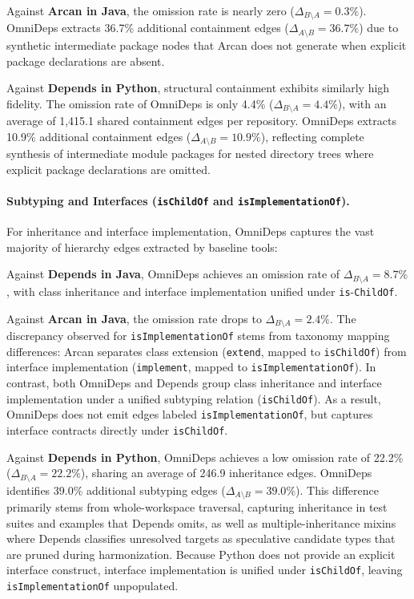 Against \textbf{Arcan in Java}, the omission rate is nearly zero
($\Delta_{B \setminus A} = 0.3\%$). OmniDeps extracts 36.7\%
additional containment edges ($\Delta_{A \setminus B} = 36.7\%$) due
to synthetic intermediate package nodes that Arcan does not generate
when explicit package declarations are absent.

Against \textbf{Depends in Python}, structural containment exhibits
similarly high fidelity. The omission rate of OmniDeps is only 4.4\%
($\Delta_{B \setminus A} = 4.4\%$), with an average of 1,415.1 shared
containment edges per repository. OmniDeps extracts 10.9\% additional
containment edges ($\Delta_{A \setminus B} = 10.9\%$), reflecting
complete synthesis of intermediate module packages for nested
directory trees where explicit package declarations are omitted.

\paragraph{Subtyping and Interfaces (\texttt{isChildOf}
and \texttt{isImplementationOf}).}
For inheritance and interface implementation, OmniDeps captures the vast
majority of hierarchy edges extracted by baseline tools:

Against \textbf{Depends in Java}, OmniDeps achieves an omission rate of
$\Delta_{B \setminus A} = 8.7\%$, with class inheritance and interface
implementation unified under \texttt{is}-\linebreak\texttt{ChildOf}.

Against \textbf{Arcan in Java}, the omission rate drops to $\Delta_{B
\setminus A} = 2.4\%$.
The discrepancy observed for \texttt{isImplementationOf} stems from taxonomy
mapping differences: Arcan separates class extension (\texttt{extend}, mapped to
\texttt{isChildOf}) from interface implementation (\texttt{implement}, mapped to
\texttt{isImplementationOf}). In contrast, both OmniDeps and Depends group class
inheritance and interface implementation under a unified subtyping relation
(\texttt{isChildOf}). As a result, OmniDeps does not emit edges labeled
\texttt{isImplementationOf}, but captures interface contracts directly under
\texttt{isChildOf}.

Against \textbf{Depends in Python}, OmniDeps achieves a low omission
rate of 22.2\% ($\Delta_{B \setminus A} = 22.2\%$), sharing an
average of 246.9 inheritance edges. OmniDeps identifies 39.0\%
additional subtyping edges ($\Delta_{A \setminus B} = 39.0\%$).
This difference primarily stems from whole-workspace traversal,
capturing inheritance in test suites and examples that Depends
omits, as well as multiple-inheritance mixins where Depends classifies
unresolved targets as speculative candidate types that are pruned during
harmonization. Because Python does not provide an explicit interface
construct, interface implementation is unified under
\texttt{isChildOf}, leaving \texttt{isImplementationOf} unpopulated.

